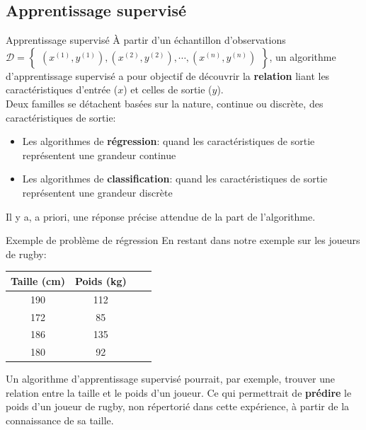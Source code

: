 \documentclass[10pt]{beamer}  %
\begin{document}
\subsection[Apprentissage supervisé]{Apprentissage supervisé}

\begin{frame}{Apprentissage supervisé}
	\`A partir d'un échantillon d'observations $\mathcal{D} = \begin{Bmatrix}(x^{(1)}, y^{(1)}), (x^{(2)}, y^{(2)}), \cdots, (x^{(n)}, y^{(n)})\end{Bmatrix}$, un algorithme d'apprentissage supervisé a pour objectif de découvrir la \textbf{relation} liant les caractéristiques d'entrée ($x$) et celles de sortie ($y$). \\
	\vspace{0.5cm}
	Deux familles se détachent basées sur la nature, continue ou discrète, des caractéristiques de sortie:
	\begin{itemize}
		\item Les algorithmes de \textbf{régression}: quand les caractéristiques de sortie représentent une grandeur continue
		\item Les algorithmes de \textbf{classification}: quand les caractéristiques de sortie représentent une grandeur discrète
	\end{itemize}
	\vspace{0.5cm}
	Il y a, a priori, une réponse précise attendue de la part de l'algorithme.
\end{frame}

\begin{frame}{Exemple de problème de régression}
	En restant dans notre exemple sur les joueurs de rugby:
	\begin{table}
		\centering
		\begin{tabular}{|c|c|c|c|}
			\hline
			\textbf{Taille} (cm) & \textbf{Poids} (kg) \\ \hline
			190             & 112 \\
			172             & 85  \\
			186             & 135 \\
			180             & 92  \\
			\hline
		\end{tabular}
	\end{table}
	Un algorithme d'apprentissage supervisé pourrait, par exemple, trouver une relation entre la taille et le poids d'un joueur. Ce qui permettrait de \textbf{prédire} le poids d'un joueur de rugby, non répertorié dans cette expérience, à partir de la connaissance de sa taille.
\end{frame}
\end{document}
